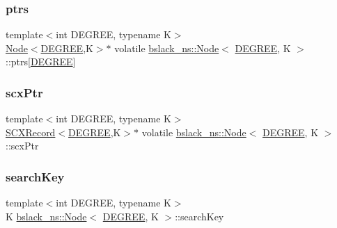 \subsubsection{\texorpdfstring{ptrs}{ptrs}}
{\footnotesize\ttfamily template$<$int D\+E\+G\+R\+EE, typename K$>$ \\
\hyperlink{structbslack__ns_1_1Node}{Node}$<$\hyperlink{brown__sigouin__abtree__kcas_2adapter_8h_a5d88b17d70c985f2f2b8e987037fd6dd}{D\+E\+G\+R\+EE},K$>$$\ast$ volatile \hyperlink{structbslack__ns_1_1Node}{bslack\+\_\+ns\+::\+Node}$<$ \hyperlink{brown__sigouin__abtree__kcas_2adapter_8h_a5d88b17d70c985f2f2b8e987037fd6dd}{D\+E\+G\+R\+EE}, K $>$\+::ptrs\mbox{[}\hyperlink{brown__sigouin__abtree__kcas_2adapter_8h_a5d88b17d70c985f2f2b8e987037fd6dd}{D\+E\+G\+R\+EE}\mbox{]}}

\mbox{\label{structbslack__ns_1_1Node_a86c5301b2a1173bd1b1bc5195242665a}} 
\subsubsection{\texorpdfstring{scx\+Ptr}{scxPtr}}
{\footnotesize\ttfamily template$<$int D\+E\+G\+R\+EE, typename K$>$ \\
\hyperlink{structbslack__ns_1_1SCXRecord}{S\+C\+X\+Record}$<$\hyperlink{brown__sigouin__abtree__kcas_2adapter_8h_a5d88b17d70c985f2f2b8e987037fd6dd}{D\+E\+G\+R\+EE},K$>$$\ast$ volatile \hyperlink{structbslack__ns_1_1Node}{bslack\+\_\+ns\+::\+Node}$<$ \hyperlink{brown__sigouin__abtree__kcas_2adapter_8h_a5d88b17d70c985f2f2b8e987037fd6dd}{D\+E\+G\+R\+EE}, K $>$\+::scx\+Ptr}

\mbox{\label{structbslack__ns_1_1Node_a8409ba747d03413ea0c6a91645015ce2}} 
\subsubsection{\texorpdfstring{search\+Key}{searchKey}}
{\footnotesize\ttfamily template$<$int D\+E\+G\+R\+EE, typename K$>$ \\
K \hyperlink{structbslack__ns_1_1Node}{bslack\+\_\+ns\+::\+Node}$<$ \hyperlink{brown__sigouin__abtree__kcas_2adapter_8h_a5d88b17d70c985f2f2b8e987037fd6dd}{D\+E\+G\+R\+EE}, K $>$\+::search\+Key}

